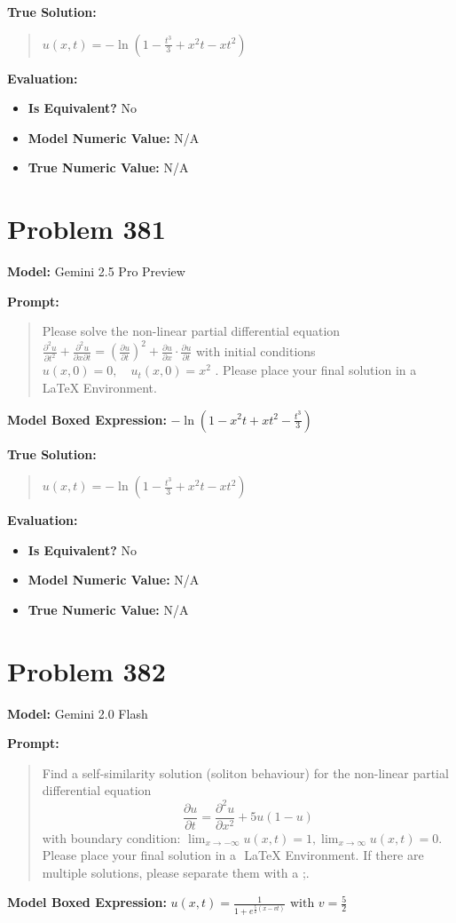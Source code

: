 \documentclass{article}
\begin{document}
{\textbf{True Solution:}
\begin{quote}
$u(x, t) = -\ln\left(1 - \frac{t^3}{3} + x^2 t - x t^2\right)$
\end{quote}

\textbf{Evaluation:}
\begin{itemize}
\item \textbf{Is Equivalent?} No
\item \textbf{Model Numeric Value:} N/A
\item \textbf{True Numeric Value:} N/A
\end{itemize}
\vspace{1cm}
\section*{Problem 381}
\textbf{Model:} Gemini 2.5 Pro Preview

\textbf{Prompt:}
\begin{quote}
Please solve the non-linear partial differential equation $\frac{\partial^2 u}{\partial t^2}+ \frac{\partial^2 u}{\partial x \partial t}= \left( \frac{\partial u}{\partial t} \right)^2+ \frac{\partial u}{\partial x} \cdot \frac{\partial u}{\partial t}$ with initial conditions $u(x, 0) = 0, \quad u_t(x, 0) = x^2$ . Please place your final solution in a $\boxed{}$ LaTeX Environment.
\end{quote}
\textbf{Model Boxed Expression:} $-\ln\left(1 - x^2t + xt^2 - \frac{t^3}{3}\right)$

\textbf{True Solution:}
\begin{quote}
$u(x, t) = -\ln\left(1 - \frac{t^3}{3} + x^2 t - x t^2\right)$
\end{quote}

\textbf{Evaluation:}
\begin{itemize}
\item \textbf{Is Equivalent?} No
\item \textbf{Model Numeric Value:} N/A
\item \textbf{True Numeric Value:} N/A
\end{itemize}
\vspace{1cm}
\section*{Problem 382}
\textbf{Model:} Gemini 2.0 Flash

\textbf{Prompt:}
\begin{quote}
Find a self-similarity solution (soliton behaviour) for the non-linear partial differential equation $$\frac{\partial u}{\partial t} = \frac{\partial^2 u}{\partial x^2} + 5u(1-u)$$ with boundary condition: $\lim_{x \to -\infty} u(x,t) = 1,\lim_{x \to \infty} u(x,t) = 0$. Please place your final solution in a $\boxed{}$ LaTeX Environment. If there are multiple solutions, please separate them with a ;.
\end{quote}
\textbf{Model Boxed Expression:} $u(x,t) = \frac{1}{1+e^{\frac{5}{2}(x-vt)}} \text{ with } v = \frac{5}{2}$

}
\end{document}
